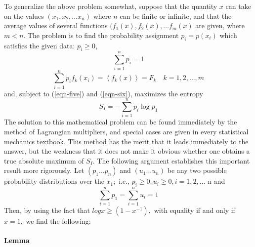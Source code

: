 \documentclass[]{article}
\begin{document}
To generalize the above problem somewhat, suppose that the quantity
\(x\) can take on the values \((x_1, x_2, \dots x_n)\) where $n$ can be finite or
infinite, and that the average values of several functions $(f_1(x), f_2(x), \dots f_m(x)$ are given, where $m < n$. The problem is to find the probability assignment $p_i =
p(x_i)$ which satisfies the given data: $p_i \geq 0$,
%
\begin{equation}
\sum_{i = 1}^{n} p_{i} = 1 \label{eqn-five}
\end{equation}
\begin{equation}
\sum_{i = 1}^{n}  p_{i}f_{k}\left( x_{i} \right) = \left\langle f_{k}(x) \right\rangle = F_{k} \quad k = 1,2,\ldots,m \label{eqn-six}
\end{equation}
%
and, subject to (\ref{eqn-five}) and (\ref{eqn-six}), maximizes the entropy
%
\begin{equation}
S_{I} = - \sum_{i = 1}^{n} p_{i}\log p_{1} \label{eqn-seven}
\end{equation}
%
The solution to this mathematical problem can be found immediately by
the method of Lagrangian multipliers, and special cases are given in
every statistical mechanics textbook. This method has the merit that it
leads immediately to the answer, but the weakness that it does not make
it obvious whether one obtains a true absolute maximum of \(S_{I}\). The
following argument establishes this important result more rigorously.
Let \(\left( p_{1}\ldots p_{n} \right)\) and
\(\left( u_{1}\ldots u_{n} \right)\) be any two possible probability
distributions over the \(x_{1};\) i.e.,
\(p_{i} \geq 0,u_{i} \geq 0,i = 1,2,\ldots\) n and
%
\begin{equation}
\sum_{i = 1}^{n} p_{1} = \sum_{i = 1}^{n} u_{i} = 1
\end{equation}
%
Then, by using the fact that
\(logx \geq \left( 1 - x^{- 1} \right),\) with equality if and only if
\(x = 1,\) we find the following:

\paragraph{Lemma}
\end{document}
